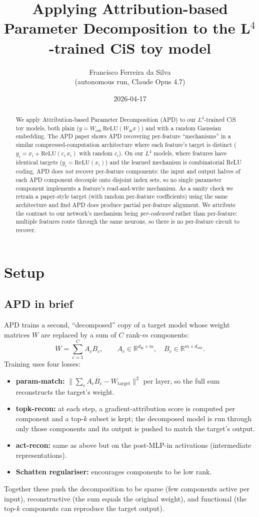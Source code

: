 \documentclass[11pt]{article}
\title{Applying Attribution-based Parameter Decomposition to the L$^4$-trained CiS toy model}
\author{Francisco Ferreira da Silva\\ \small (autonomous run, Claude Opus 4.7)}
\date{2026-04-17}
\newcommand{\Wein}{W_{\mathrm{in}}}
\newcommand{\Weout}{W_{\mathrm{out}}}
\begin{document}
\maketitle

\begin{abstract}
\noindent
We apply Attribution-based Parameter Decomposition (APD) \cite{bushnaqspd}
to our $L^4$-trained CiS toy models, both plain
($y = \Weout\,\mathrm{ReLU}(\Wein x)$) and with a random Gaussian embedding.
The APD paper shows APD recovering per-feature ``mechanisms'' in a similar
compressed-computation architecture where each feature's target is distinct
($y_i = x_i + \mathrm{ReLU}(c_i\,x_i)$ with random $c_i$). On our $L^4$
models, where features have identical targets ($y_i = \mathrm{ReLU}(x_i)$)
and the learned mechanism is combinatorial ReLU coding, APD does
\emph{not} recover per-feature components: the input and output halves of
each APD component decouple onto disjoint index sets, so no single
parameter component implements a feature's read-and-write mechanism. As a
sanity check we retrain a paper-style target (with random per-feature
coefficients) using the same architecture and find APD does produce
partial per-feature alignment. We attribute the contrast to our network's
mechanism being \emph{per-codeword} rather than per-feature: multiple
features route through the same neurons, so there is no per-feature
circuit to recover.
\end{abstract}

\section{Setup}

\subsection{APD in brief}

APD \cite{bushnaqspd} trains a second, ``decomposed'' copy of a target
model whose weight matrices $W$ are replaced by a sum of $C$ rank-$m$
components:
\[
W = \sum_{c=1}^{C} A_c B_c,\qquad A_c \in \mathbb{R}^{d_\mathrm{in}\times m},\quad B_c \in \mathbb{R}^{m\times d_\mathrm{out}}.
\]
Training uses four losses:
\begin{itemize}
\item \textbf{param-match:} $\|\sum_c A_cB_c - W_\mathrm{target}\|^2$ per layer,
  so the full sum reconstructs the target's weight.
\item \textbf{topk-recon:} at each step, a gradient-attribution score is computed
  per component and a top-$k$ subset is kept; the decomposed model is run
  through only those components and its output is pushed to match the
  target's output.
\item \textbf{act-recon:} same as above but on the post-MLP-in activations
  (intermediate representations).
\item \textbf{Schatten regulariser:} encourages components to be low rank.
\end{itemize}
Together these push the decomposition to be sparse (few components active
per input), reconstructive (the sum equals the original weight), and
functional (the top-$k$ components can reproduce the target output).
\end{document}
